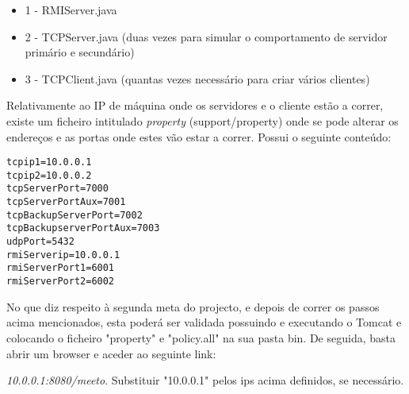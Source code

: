 \documentclass[12pt]{article} %
\begin{document}
\begin{itemize}
	\item 1 - RMIServer.java
 	\item 2 - TCPServer.java (duas vezes para simular o comportamento de servidor primário e secundário)
	\item 3 - TCPClient.java (quantas vezes necessário para criar vários clientes)
\end{itemize}

Relativamente ao IP de máquina onde os servidores e o cliente estão a correr, existe um ficheiro intitulado \emph{property} (support/property) onde se pode alterar os endereços e as portas onde estes vão estar a correr. Possui o seguinte conteúdo:

\begin{verbatim}
tcpip1=10.0.0.1
tcpip2=10.0.0.2
tcpServerPort=7000
tcpServerPortAux=7001
tcpBackupServerPort=7002
tcpBackupserverPortAux=7003
udpPort=5432
rmiServerip=10.0.0.1
rmiServerPort1=6001
rmiServerPort2=6002

\end{verbatim}

No que diz respeito à segunda meta do projecto, e depois de correr os passos acima mencionados, esta poderá ser validada possuindo e executando o Tomcat e colocando o ficheiro "property" e "policy.all" na sua pasta bin. De seguida, basta abrir um browser e aceder ao seguinte link:

\emph{10.0.0.1:8080/meeto}. Substituir "10.0.0.1" pelos ips acima definidos, se necessário.
\end{document}
